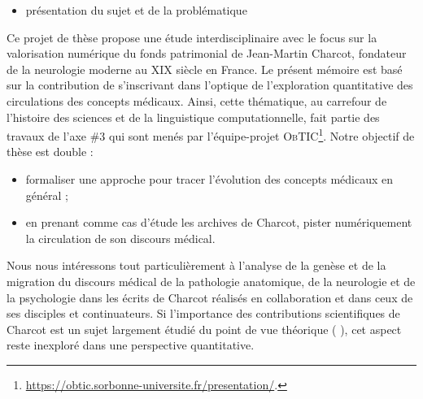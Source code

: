 \minitoc%



\begin{itemize}
\item présentation du sujet et de la problématique
\end{itemize}

Ce projet de thèse propose une étude interdisciplinaire avec le focus sur la valorisation numérique du fonds patrimonial de Jean-Martin Charcot, fondateur de la neurologie moderne au XIX\ieme{} siècle en France.
Le présent mémoire est basé sur la contribution de \citet{petkovic2023circulation} s'inscrivant dans l'optique de l'exploration quantitative des circulations des concepts médicaux. Ainsi, cette thématique, au carrefour de l'histoire des sciences et de la linguistique computationnelle, fait partie des travaux de l'axe \#3 qui sont menés par l'équipe-projet \textsc{ObTIC}\footnote{\url{https://obtic.sorbonne-universite.fr/presentation/}.}. 
Notre objectif de thèse est double :
\begin{itemize} 
\item formaliser une approche pour tracer l'évolution des concepts médicaux en général ;
\item en prenant comme cas d'étude les archives de Charcot, pister numériquement la circulation de son discours médical.
\end{itemize}

Nous nous intéressons tout particulièrement à l'analyse de la genèse et de la migration du discours médical de la pathologie anatomique, de la neurologie et de la psychologie dans les écrits de Charcot réalisés en collaboration et dans ceux de ses disciples et continuateurs. Si l'importance des contributions scientifiques de Charcot est un sujet largement étudié du point de vue théorique (\citealp{bogousslavsky2011following,broussolle2012,camargo2024} ), cet aspect reste inexploré dans une perspective quantitative.

